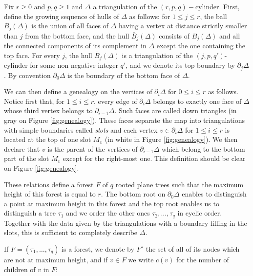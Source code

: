 \documentclass[AHL,XML,longabstracts,Unicode,NoSaveZebib]{cedram}
\begin{document}
Fix $r \geq 0$ and $p,q\geq1$ and $\Delta$ a triangulation of the $(r,p,q)-$cylinder. First, define the growing sequence of hulls of $\Delta$ as follows: for $1 \leq j \leq r$, the ball $B_j(\Delta)$ is the union of all faces of $\Delta$ having a vertex at distance strictly smaller than $j$ from the bottom face, and the hull $\overline{B}_j (\Delta)$ consists of $B_j(\Delta)$ and all the connected components of its complement in $\Delta$ except the one containing the top face.  For every $j$, the hull $\overline{B}_j (\Delta)$ is a triangulation of the $(j,p,q')$-cylinder for some non negative integer $q'$, and we denote its top boundary by $\partial_j \Delta$. By convention $\partial_0 \Delta$ is the boundary of the bottom face of $\Delta$.

We can then define a genealogy on the vertices of $\partial_i \Delta$ for $0 \leq i \leq r$ as follows.
Notice first that, for $1 \leq i \leq r$, every edge of $\partial_i \Delta$ belongs to exactly one face of $\Delta$ whose third vertex belongs to $\partial_{i-1} \Delta$. Such faces are called down triangles (in gray on Figure \ref{fig:genealogy}). These faces separate the map into triangulations with simple boundaries called \emph{slots} and each vertex $v \in \partial_i \Delta$ for $1 \leq i \leq r$ is located at the top of one slot $M_{v}$ (in white in Figure \ref{fig:genealogy}). We then declare that $v$ is the parent of the vertices of $\partial _{i-1} \Delta$ which belong to the bottom part of the slot $M_{v}$ except for the right-most one. This definition should be clear on
Figure \ref{fig:genealogy}.

These relations define a forest $F$ of $q$ rooted plane trees such that the maximum height of this forest is equal to $r$. The bottom root on $\partial_{0} \Delta$ enables to distinguish a point at maximum height in this forest and the top root enables us to distinguish a tree $\tau_{1}$ and we order the other ones $\tau_{2}, \dots , \tau_{q}$ in cyclic order. Together with the data given by the triangulations with a boundary filling in the slots, this is sufficient to completely describe $\Delta$.

If $F = (\tau_{1}, \dots , \tau_{q})$ is a forest, we denote by $F^{\star}$ the set of all of its nodes which are not at maximum height, and if $v \in F$ we write $c(v)$ for the number of children of $v$ in $F$:


\begin{center}
\end{center}
\end{document}
